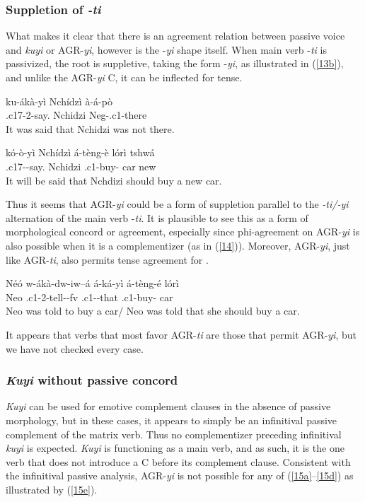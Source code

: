 \documentclass[output=paper,
modfonts
]{langscibook}
\begin{document}
\subsubsection{Suppletion of \textit{-ti}}

What makes it clear that there is an agreement relation between passive voice and \textit{kuyi} or AGR-\textit{yi}, however is the -\textit{yi} shape itself. When main verb -\textit{ti} is passivized, the root is suppletive, taking the form -\textit{yi}, as illustrated in (\ref{13b}), and unlike the AGR-\textit{yi} C, it can be inflected for tense.

\ea
\ea \gll ku-ákà-yì Nchídzì à-á-pò\\
	.c17-2-say. Nchidzi	Neg-.c1-there\\
	\glt It was said that Nchidzi was not there.

\ex \label{13b} \gll kó-ò-yì Nchídzì	á-tèng-è lórì tshwá\\
	.c17--say.	Nchidzi	.c1-buy-	car	new\\
     \glt It will be said that Nchdizi should buy a new car. \z \z

Thus it seems that AGR-\textit{yi} could be a form of suppletion parallel to the \textit{-ti/-yi} alternation of the main verb -\textit{ti}. It is plausible to see this as a form of morphological concord or agreement, especially since phi-agreement on AGR-\textit{yi} is also possible when it is a complementizer (as in (\ref{14})). Moreover, AGR-\textit{yi}, just like AGR-\textit{ti}, also permits tense agreement for .  

\ea\label{14} \gll Néó	w-ákà-dw-iw–á á-ká-yì á-tèng-é lórì\\
	Neo	.c1-2-tell--fv  .c1--that .c1-buy-	car\\
	\glt Neo was told to buy a car/ Neo was told that she should buy a car. \z

It appears that verbs that most favor AGR-\textit{ti} are those that permit AGR-\textit{yi}, but we have not checked every case.

\subsubsection{\textit{Kuyi} without passive concord}

\textit{Kuyi} can be used for emotive complement clauses in the absence of passive morphology, but in these cases, it appears to simply be an infinitival passive complement of the matrix verb. Thus no complementizer preceding infinitival \textit{kuyi} is expected. \textit{Kuyi} is functioning as a main verb, and as such, it is the one verb that does not introduce a C before its complement clause. Consistent with the infinitival passive analysis, AGR-\textit{yi} is not possible for any of (\ref{15a}--\ref{15d}) as illustrated by (\ref{15e}). %
\end{document}
